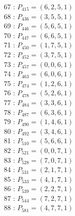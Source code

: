 \documentclass{article}
\begin{document}
{\begin{multicols}{3}
67 : $P_{415}=( 6, 2, 5, 1 )$\\
68 : $P_{436}=( 3, 5, 5, 1 )$\\
69 : $P_{446}=( 5, 6, 5, 1 )$\\
70 : $P_{447}=( 6, 6, 5, 1 )$\\
71 : $P_{450}=( 1, 7, 5, 1 )$\\
72 : $P_{452}=( 3, 7, 5, 1 )$\\
73 : $P_{457}=( 0, 0, 6, 1 )$\\
74 : $P_{463}=( 6, 0, 6, 1 )$\\
75 : $P_{474}=( 1, 2, 6, 1 )$\\
76 : $P_{478}=( 5, 2, 6, 1 )$\\
77 : $P_{484}=( 3, 3, 6, 1 )$\\
78 : $P_{487}=( 6, 3, 6, 1 )$\\
79 : $P_{490}=( 1, 4, 6, 1 )$\\
80 : $P_{492}=( 3, 4, 6, 1 )$\\
81 : $P_{510}=( 5, 6, 6, 1 )$\\
82 : $P_{521}=( 0, 0, 7, 1 )$\\
83 : $P_{528}=( 7, 0, 7, 1 )$\\
84 : $P_{531}=( 2, 1, 7, 1 )$\\
85 : $P_{533}=( 4, 1, 7, 1 )$\\
86 : $P_{539}=( 2, 2, 7, 1 )$\\
87 : $P_{544}=( 7, 2, 7, 1 )$\\
88 : $P_{581}=( 4, 7, 7, 1 )$\\
\end{multicols}


%


%


}%
\end{document}
